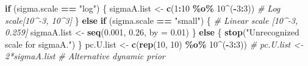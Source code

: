 \documentclass[
]{article}
\newenvironment{Shaded}{\begin{snugshade}}{\end{snugshade}}
\newcommand{\AttributeTok}[1]{\textcolor[rgb]{0.13,0.29,0.53}{#1}}
\newcommand{\CommentTok}[1]{\textcolor[rgb]{0.56,0.35,0.01}{\textit{#1}}}
\newcommand{\ControlFlowTok}[1]{\textcolor[rgb]{0.13,0.29,0.53}{\textbf{#1}}}
\newcommand{\DecValTok}[1]{\textcolor[rgb]{0.00,0.00,0.81}{#1}}
\newcommand{\FloatTok}[1]{\textcolor[rgb]{0.00,0.00,0.81}{#1}}
\newcommand{\FunctionTok}[1]{\textcolor[rgb]{0.13,0.29,0.53}{\textbf{#1}}}
\newcommand{\NormalTok}[1]{#1}
\newcommand{\OtherTok}[1]{\textcolor[rgb]{0.56,0.35,0.01}{#1}}
\newcommand{\SpecialCharTok}[1]{\textcolor[rgb]{0.81,0.36,0.00}{\textbf{#1}}}
\newcommand{\StringTok}[1]{\textcolor[rgb]{0.31,0.60,0.02}{#1}}
\begin{document}
\begin{Shaded}
\begin{Highlighting}[]
  \ControlFlowTok{if}\NormalTok{ (sigma.scale }\SpecialCharTok{==} \StringTok{"log"}\NormalTok{) \{}
\NormalTok{    sigmaA.list }\OtherTok{\textless{}{-}} \FunctionTok{c}\NormalTok{(}\DecValTok{1}\SpecialCharTok{:}\DecValTok{10} \SpecialCharTok{\%o\%} \DecValTok{10}\SpecialCharTok{\^{}}\NormalTok{(}\SpecialCharTok{{-}}\DecValTok{3}\SpecialCharTok{:}\DecValTok{3}\NormalTok{)) }\CommentTok{\# Log scale[10\^{}{-}3,  10\^{}3]}
\NormalTok{  \} }\ControlFlowTok{else} \ControlFlowTok{if}\NormalTok{ (sigma.scale }\SpecialCharTok{==} \StringTok{"small"}\NormalTok{) \{ }\CommentTok{\# Linear scale [10\^{}{-}3, 0.259]}
\NormalTok{    sigmaA.list }\OtherTok{\textless{}{-}} \FunctionTok{seq}\NormalTok{(}\FloatTok{0.001}\NormalTok{, }\FloatTok{0.26}\NormalTok{, }\AttributeTok{by =} \FloatTok{0.01}\NormalTok{)}
\NormalTok{  \} }\ControlFlowTok{else}\NormalTok{ \{}
    \FunctionTok{stop}\NormalTok{(}\StringTok{"Unrecognized scale for sigmaA."}\NormalTok{)}
\NormalTok{  \}}
\NormalTok{  pc.U.list }\OtherTok{\textless{}{-}} \FunctionTok{c}\NormalTok{(}\FunctionTok{rep}\NormalTok{(}\DecValTok{10}\NormalTok{, }\DecValTok{10}\NormalTok{) }\SpecialCharTok{\%o\%} \DecValTok{10}\SpecialCharTok{\^{}}\NormalTok{(}\SpecialCharTok{{-}}\DecValTok{3}\SpecialCharTok{:}\DecValTok{3}\NormalTok{))}
  \CommentTok{\# pc.U.list \textless{}{-} 2*sigmaA.list \# Alternative dynamic prior}


\end{Highlighting}
\end{Shaded}
\end{document}
